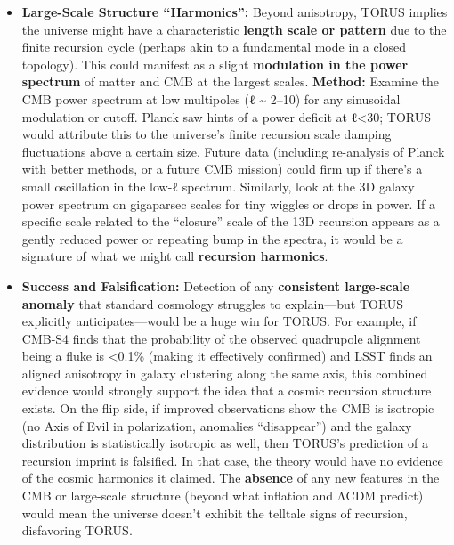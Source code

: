 \begin{itemize}
\begin{itemize}
{    ``hot/cold'' spots and the pattern of matter distribution} if both
    are influenced by the same recursion geometry​. For instance, the
    plane along which the CMB quadrupole is weakest might be the plane
    dividing a slightly higher-density half of the local universe from a
    lower-density half​. If analyses find that the CMB's weird features
    have a counterpart in galaxy data (a very specific, unlikely
    coincidence under random isotropy), that would strongly point to a
    common cause like TORUS's toroidal universe model​.
  \item
    \textbf{Large-Scale Structure ``Harmonics'':} Beyond anisotropy,
    TORUS implies the universe might have a characteristic
    \textbf{length scale or pattern} due to the finite recursion cycle
    (perhaps akin to a fundamental mode in a closed topology). This
    could manifest as a slight \textbf{modulation in the power spectrum}
    of matter and CMB at the largest scales. \textbf{Method:} Examine
    the CMB power spectrum at low multipoles (ℓ \textasciitilde{} 2--10)
    for any sinusoidal modulation or cutoff. Planck saw hints of a power
    deficit at ℓ\textless{}30; TORUS would attribute this to the
    universe's finite recursion scale damping fluctuations above a
    certain size​. Future data (including re-analysis of Planck with
    better methods, or a future CMB mission) could firm up if there's a
    small oscillation in the low-ℓ spectrum. Similarly, look at the 3D
    galaxy power spectrum on gigaparsec scales for tiny wiggles or drops
    in power. If a specific scale related to the ``closure'' scale of
    the 13D recursion appears as a gently reduced power or repeating
    bump in the spectra, it would be a signature of what we might call
    \textbf{recursion harmonics}​.
  \item
    \textbf{Success and Falsification:} Detection of any
    \textbf{consistent large-scale anomaly} that standard cosmology
    struggles to explain---but TORUS explicitly anticipates---would be a
    huge win for TORUS. For example, if CMB-S4 finds that the
    probability of the observed quadrupole alignment being a fluke is
    \textless{}0.1\% (making it effectively confirmed) and LSST finds an
    aligned anisotropy in galaxy clustering along the same axis, this
    combined evidence would strongly support the idea that a cosmic
    recursion structure exists​. On the flip side, if improved
    observations show the CMB is isotropic (no Axis of Evil in
    polarization, anomalies ``disappear'') and the galaxy distribution
    is statistically isotropic as well, then TORUS's prediction of a
    recursion imprint is falsified​. In that case, the theory would have
    no evidence of the cosmic harmonics it claimed. The \textbf{absence}
    of any new features in the CMB or large-scale structure (beyond what
    inflation and ΛCDM predict) would mean the universe doesn't exhibit
    the telltale signs of recursion, disfavoring TORUS.
  \end{itemize}
\end{itemize}

